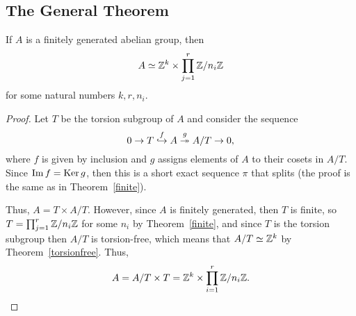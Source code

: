 \subsection{The General Theorem}
\begin{thm}
\label{fgagtheorem}
If $A$ is a finitely generated abelian group, then \[A\simeq \mathbb{Z}^k\times \prod_{j=1}^r \mathbb{Z}/n_i\mathbb{Z}\] for some natural numbers $k,r,n_i$.
\end{thm}
\begin{proof}
Let $T$ be the torsion subgroup of $A$ and consider the sequence
\[0\to T\stackrel f{\hookrightarrow} A\stackrel g{\twoheadrightarrow} A/T \to 0,\]
where $f$ is given by inclusion and $g$ assigns elements of $A$ to their cosets in $A/T$. Since $\operatorname{Im} f = \operatorname{Ker} g$, then this is a short exact sequence $\pi$ that splits (the proof is the same as in Theorem~\ref{finite}).

Thus, $A = T\times A/T$. However, since $A$ is finitely generated, then $T$ is finite, so $T = \prod_{j=1}^r \mathbb{Z}/n_i\mathbb{Z}$ for some $n_i$ by Theorem~\ref{finite}, and since $T$ is the torsion subgroup then $A/T$ is torsion-free, which means that $A/T \simeq \mathbb{Z}^k$ by Theorem~\ref{torsionfree}. Thus,
\[A = A/T\times T = \mathbb{Z}^k\times \prod_{i=1}^r \mathbb{Z}/n_i\mathbb{Z}.\qedhere\]
\end{proof}
%
